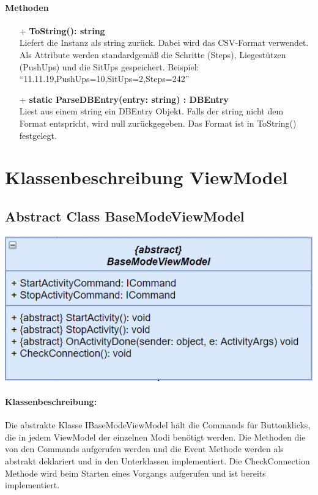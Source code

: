 \documentclass[a4paper,12pt]{article}
\begin{document}
	 \paragraph{Methoden}
	 \begin{itemize}
	 	\item[+] \textbf{ToString(): string}\\Liefert die Instanz als string zurück. Dabei wird das \gls{CSV}-Format verwendet. Als Attribute werden standardgemäß die Schritte (Steps), Liegestützen (PushUps) und die SitUps gespeichert.
	 	Beispiel: ``11.11.19,PushUps=10,SitUps=2,Steps=242''\\
	 	\item[+] \textbf{static ParseDBEntry(entry: string) : DBEntry}\\Liest aus einem string ein DBEntry Objekt. Falls der string nicht dem Format entspricht, wird null zurückgegeben. Das Format ist in ToString() festgelegt.\\
	\end{itemize}











\section{Klassenbeschreibung ViewModel}
\subsection{Abstract Class BaseModeViewModel} 
\includegraphics{bilder/ViewModelKlassen/BaseModeViewModel}

\paragraph{Klassenbeschreibung:}
Die abstrakte Klasse IBaseModeViewModel hält die Commands für Buttonklicks, die in jedem ViewModel der einzelnen Modi benötigt werden. Die Methoden die von den Commands aufgerufen werden und die Event Methode werden als abstrakt deklariert und in den Unterklassen implementiert. Die CheckConnection Methode wird beim Starten eines Vorgangs aufgerufen und ist bereits implementiert.
\end{document}

